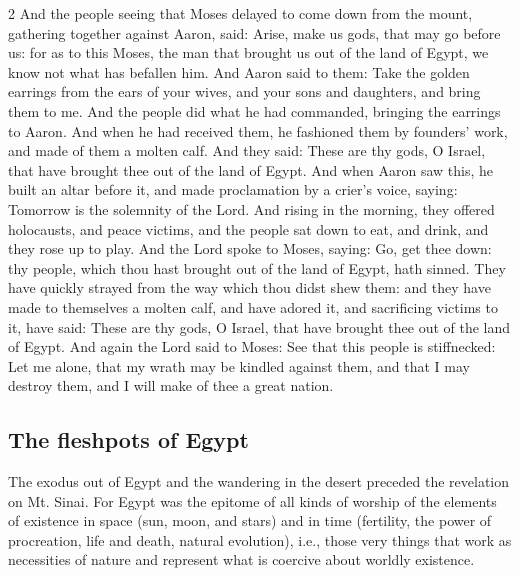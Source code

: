\begin{multicols}{2}\small
And the people seeing that Moses delayed to come down from the mount, gathering together against Aaron, said: Arise, make us gods, that may go before us: for as to this Moses, the man that brought us out of the land of Egypt, we know not what has befallen him. And Aaron said to them: Take the golden earrings from the ears of your wives, and your sons and daughters, and bring them to me. And the people did what he had commanded, bringing the earrings to Aaron. And when he had received them, he fashioned them by founders' work, and made of them a molten calf. And they said: These are thy gods, O Israel, that have brought thee out of the land of Egypt. And when Aaron saw this, he built an altar before it, and made proclamation by a crier's voice, saying: Tomorrow is the solemnity of the Lord. And rising in the morning, they offered holocausts, and peace victims, and the people sat down to eat, and drink, and they rose up to play. And the Lord spoke to Moses, saying: Go, get thee down: thy people, which thou hast brought out of the land of Egypt, hath sinned. They have quickly strayed from the way which thou didst shew them: and they have made to themselves a molten calf, and have adored it, and sacrificing victims to it, have said: These are thy gods, O Israel, that have brought thee out of the land of Egypt. And again the Lord said to Moses: See that this people is stiffnecked: Let me alone, that my wrath may be kindled against them, and that I may destroy them, and I will make of thee a great nation.
\end{multicols}

\subsection{The fleshpots of Egypt}

The exodus out of Egypt and the wandering in the desert preceded the revelation on Mt. Sinai. For Egypt was the epitome of all kinds of worship of the elements of existence in space (sun, moon, and stars) and in time (fertility, the power of procreation, life and death, natural evolution), i.e., those very things that work as necessities of nature and represent what is coercive about worldly existence.

